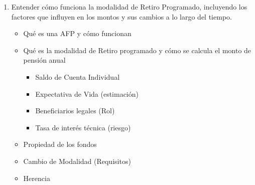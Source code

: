 \begin{enumerate}
\begin{enumerate}
        \item Entender cómo funciona la modalidad de Retiro Programado, incluyendo los factores que influyen en los montos y sus cambios a lo largo del tiempo.
        \begin{itemize}
        \item Qué es una AFP y cómo funcionan 
        \item Qué es la modalidad de Retiro programado y cómo se calcula el monto de pensión anual 
        \begin{itemize}
        \item Saldo de Cuenta Individual 
        \item Expectativa de Vida (estimación)
        \item Beneficiarios legales (Rol)
        \item Tasa de interés técnica (riesgo) 
        \end{itemize}
        \item Propiedad de los fondos 
        \item Cambio de Modalidad (Requisitos) 
        \item Herencia 
        \end{itemize}


\end{enumerate}
\end{enumerate}
